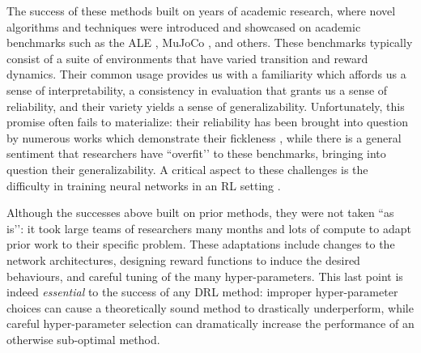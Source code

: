 \documentclass[10pt]{article} %
\begin{document}
The success of these methods built on years of academic research, where novel algorithms and techniques were introduced and showcased on academic benchmarks such as the ALE \citep{bellemare2012ale}, MuJoCo \citep{todorov2012mujoco}, and others. These benchmarks typically consist of a suite of environments that have varied transition and reward dynamics. Their common usage provides us with a familiarity which affords us a sense of interpretability, a consistency in evaluation that grants us a sense of reliability, and their variety yields a sense of generalizability. Unfortunately, this promise often fails to materialize: their reliability has been brought into question by numerous works which demonstrate their fickleness \citep{Henderson2017DeepRL,agarwal2021deep}, while there is a general sentiment that researchers have ``overfit’’ to these benchmarks, bringing into question their generalizability. A critical aspect to these challenges is the difficulty in training neural networks in an RL setting \citep{ostrovski2021the,lyle2022learning,sokar2023dormant}.

Although the successes above built on prior methods, they were not taken ``as is’’: it took large teams of researchers many months and lots of compute to adapt prior work to their specific problem. These adaptations include changes to the network architectures, designing reward functions to induce the desired behaviours, and careful tuning of the many hyper-parameters. This last point is indeed {\em essential} to the success of any DRL method: improper hyper-parameter choices can cause a theoretically sound method to drastically underperform, while careful hyper-parameter selection can dramatically increase the performance of an otherwise sub-optimal method.
\end{document}
